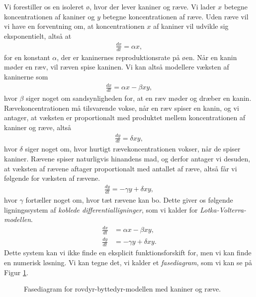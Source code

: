 \documentclass[12pt]{article}
\begin{document}
Vi forestiller os en isoleret ø, hvor der lever kaniner og ræve. Vi lader $x$ betegne koncentrationen af kaniner og $y$ betegne koncentrationen af ræve. Uden ræve vil vi have en forventning om, at koncentrationen $x$ af kaniner vil udvikle sig eksponentielt, altså at
\begin{align*}
	\frac{dx}{dt} = \alpha x,
\end{align*} 
for en konstant $\alpha$, der er kaninernes reproduktionsrate på øen. Når en kanin møder en ræv, vil ræven spise kaninen. Vi kan altså modellere væksten af kaninerne som 
\begin{align*}
	\frac{dx}{dt} = \alpha x - \beta xy,
\end{align*}
hvor $\beta$ siger noget om sandsynligheden for, at en ræv møder og dræber en kanin. 
Rævekoncentrationen må tilsvarende vokse, når en ræv spiser en kanin, og vi antager, at væksten er proportionalt med produktet mellem koncentrationen af kaniner og ræve, altså
\begin{align*}
	\frac{dy}{dt} = \delta xy,
\end{align*}
hvor $\delta$ siger noget om, hvor hurtigt rævekoncentrationen vokser, når de spiser kaniner. 
Rævene spiser naturligvis hinandens mad, og derfor antager vi desuden, at væksten af rævene aftager proportionalt med antallet af ræve, altså får vi følgende for væksten af rævene.
\begin{align*}
	\frac{dy}{dt} = -\gamma y + \delta xy, 
\end{align*}
hvor $\gamma$ fortæller noget om, hvor tæt rævene kan bo.
Dette giver os følgende ligningssystem af \textit{koblede differentialligninger}, som vi kalder for 
\textit{Lotka-Volterra-modellen}.
\begin{align}
	\frac{dx}{dt} &= \alpha x - \beta xy, \\
	\frac{dy}{dt} &= -\gamma y + \delta xy.
\end{align}
Dette system kan vi ikke finde en eksplicit funktionsforskift for, men vi kan finde en numerisk løsning. Vi kan tegne det, vi kalder et \textit{fasediagram}, som vi kan se på Figur \ref{fig:fasediagram}.
\begin{figure}[H]
	\centering
	\caption{Fasediagram for rovdyr-byttedyr-modellen med kaniner og ræve.}
	\label{fig:fasediagram}
\end{figure}
\end{document}
